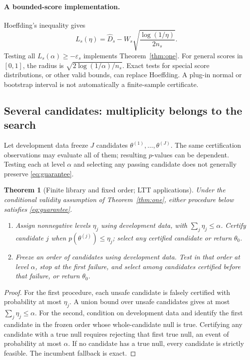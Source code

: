 \documentclass[11pt,letterpaper]{article}
\newtheorem{theorem}{Theorem}
\newcommand{\old}{\theta_0}
\newcommand{\eps}{\varepsilon}
\begin{document}
\paragraph{A bounded-score implementation.}
Hoeffding's inequality \citep{hoeffding1963} gives
\begin{equation}
L_s(\eta)=\widehat D_s-W_s\sqrt{\frac{\log(1/\eta)}{2n_s}}.
\label{eq:hoeffding}
\end{equation}
Testing all $L_s(\alpha)\geq-\eps_s$ implements Theorem~\ref{thm:one}. For general scores in $[0,1]$, the radius is $\sqrt{2\log(1/\alpha)/n_s}$. Exact tests for special score distributions, or other valid bounds, can replace Hoeffding. A plug-in normal or bootstrap interval is not automatically a finite-sample certificate.

\subsection{Several candidates: multiplicity belongs to the search}
Let development data freeze $J$ candidates $\theta^{(1)},\ldots,\theta^{(J)}$. The same certification observations may evaluate all of them; resulting $p$-values can be dependent. Testing each at level $\alpha$ and selecting any passing candidate does not generally preserve \eqref{eq:guarantee}.

\begin{theorem}[Finite library and fixed order; LTT applications]
\label{thm:many}
Under the conditional validity assumption of Theorem~\ref{thm:one}, either procedure below satisfies \eqref{eq:guarantee}.
\begin{enumerate}
\item Assign nonnegative levels $\eta_j$ using development data, with $\sum_j\eta_j\leq\alpha$. Certify candidate $j$ when $p(\theta^{(j)})\leq\eta_j$; select any certified candidate or return $\old$.
\item Freeze an order of candidates using development data. Test in that order at level $\alpha$, stop at the first failure, and select among candidates certified before that failure, or return $\old$.
\end{enumerate}
\end{theorem}
\begin{proof}
For the first procedure, each unsafe candidate is falsely certified with probability at most $\eta_j$. A union bound over unsafe candidates gives at most $\sum_j\eta_j\leq\alpha$. For the second, condition on development data and identify the first candidate in the frozen order whose whole-candidate null is true. Certifying any candidate with a true null requires rejecting that first true null, an event of probability at most $\alpha$. If no candidate has a true null, every candidate is strictly feasible. The incumbent fallback is exact.
\end{proof}
\end{document}
